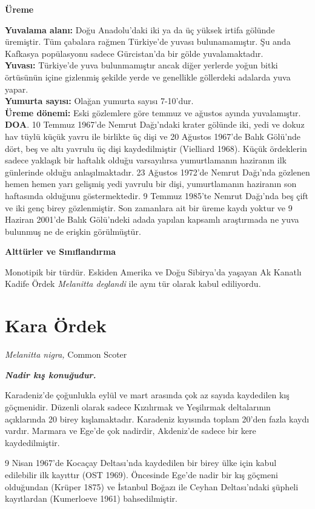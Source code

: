 \documentclass[
  letterpaper,
  DIV=11,
  numbers=noendperiod]{scrreprt}
\begin{document}
\textbf{Üreme}

\textbf{Yuvalama alanı:} Doğu Anadolu'daki iki ya da üç yüksek irtifa
gölünde üremiştir. Tüm çabalara rağmen Türkiye'de yuvası bulunamamıştır.
Şu anda Kafkasya popülasyonu sadece Gürcistan'da bir gölde
yuvalamaktadır.\\
\textbf{Yuvası:} Türkiye'de yuva bulunmamıştır ancak diğer yerlerde
yoğun bitki örtüsünün içine gizlenmiş şekilde yerde ve genellikle
göllerdeki adalarda yuva yapar.\\
\textbf{Yumurta sayısı:} Olağan yumurta sayısı 7-10'dur.\\
\textbf{Üreme dönemi:} Eski gözlemlere göre temmuz ve ağustos ayında
yuvalamıştır. \textbf{DOA}. 10 Temmuz 1967'de Nemrut Dağı'ndaki krater
gölünde iki, yedi ve dokuz hav tüylü küçük yavru ile birlikte üç dişi ve
20 Ağustos 1967'de Balık Gölü'nde dört, beş ve altı yavrulu üç dişi
kaydedilmiştir (Vielliard 1968). Küçük ördeklerin sadece yaklaşık bir
haftalık olduğu varsayılırsa yumurtlamanın haziranın ilk günlerinde
olduğu anlaşılmaktadır. 23 Ağustos 1972'de Nemrut Dağı'nda gözlenen
hemen hemen yarı gelişmiş yedi yavrulu bir dişi, yumurtlamanın haziranın
son haftasında olduğunu göstermektedir. 9 Temmuz 1985'te Nemrut Dağı'nda
beş çift ve iki genç birey gözlenmiştir. Son zamanlara ait bir üreme
kaydı yoktur ve 9 Haziran 2001'de Balık Gölü'ndeki adada yapılan
kapsamlı araştırmada ne yuva bulunmuş ne de erişkin görülmüştür.

\textbf{Alttürler ve Sınıflandırma}

Monotipik bir türdür. Eskiden Amerika ve Doğu Sibirya'da yaşayan Ak
Kanatlı Kadife Ördek \emph{Melanitta deglandi} ile aynı tür olarak kabul
ediliyordu.

\section{Kara Ördek}\label{kara-uxf6rdek}

\emph{Melanitta nigra,} Common Scoter

\textbf{\emph{Nadir kış konuğudur.}}

Karadeniz'de çoğunlukla eylül ve mart arasında çok az sayıda kaydedilen
kış göçmenidir. Düzenli olarak sadece Kızılırmak ve Yeşilırmak
deltalarının açıklarında 20 birey kışlamaktadır. Karadeniz kıyısında
toplam 20'den fazla kaydı vardır. Marmara ve Ege'de çok nadirdir,
Akdeniz'de sadece bir kere kaydedilmiştir.

9 Nisan 1967'de Kocaçay Deltası'nda kaydedilen bir birey ülke için kabul
edilebilir ilk kayıttır (OST 1969). Öncesinde Ege'de nadir bir kış
göçmeni olduğundan (Krüper 1875) ve İstanbul Boğazı ile Ceyhan
Deltası'ndaki şüpheli kayıtlardan (Kumerloeve 1961) bahsedilmiştir.
\end{document}
